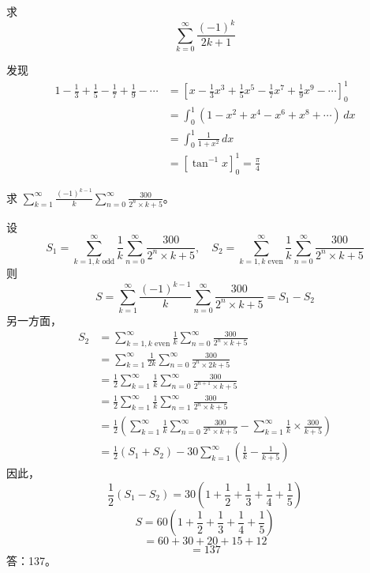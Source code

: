 \begin{questions}
    \question 求
    \[
    \sum_{k=0}^{\infty} \frac{(-1)^k}{2k+1}
    \]
    \begin{solution}
        发现
        \begin{align*}
        1-\frac{1}{3}+\frac{1}{5}-\frac{1}{7}+\frac{1}{9}- \cdots
        &= \left[x-\frac{1}{3}x^3 +\frac{1}{5}x^5 -\frac{1}{7}x^7+\frac{1}{9}x^9-\cdots\right] _0^1 \\
        &=\int_0^1 (1-x^2+x^4-x^6+x^8+\cdots)\,dx \\
        &=\int_0^1 \frac{1}{1+x^2}\,dx \\
        &= \left[ \tan^{-1} x \right]_0^1 = \frac{\pi}{4}
        \end{align*}
    \end{solution}

    \question 求 $\sum_{k=1}^{\infty} \frac{(-1)^{k-1}}{k} \sum_{n=0}^{\infty} \frac{300}{2^n \times k + 5}$。

\begin{solution}
设
\[
S_1 = \sum_{k=1, k \text{ odd}}^{\infty} \frac{1}{k} \sum_{n=0}^{\infty} \frac{300}{2^n \times k + 5}, \quad S_2 = \sum_{k=1, k \text{ even}}^{\infty} \frac{1}{k} \sum_{n=0}^{\infty} \frac{300}{2^n \times k + 5}
\]
则
\[
S = \sum_{k=1}^{\infty} \frac{(-1)^{k-1}}{k} \sum_{n=0}^{\infty} \frac{300}{2^n \times k + 5} = S_1 - S_2
\]
另一方面，
\begin{align*}
S_2 &= \sum_{k=1, k \text{ even}}^{\infty} \frac{1}{k} \sum_{n=0}^{\infty} \frac{300}{2^n \times k + 5} \\
&= \sum_{k=1}^{\infty} \frac{1}{2k} \sum_{n=0}^{\infty} \frac{300}{2^n \times 2k + 5} \\
&= \frac{1}{2} \sum_{k=1}^{\infty} \frac{1}{k} \sum_{n=0}^{\infty} \frac{300}{2^{n+1} \times k + 5} \\
&= \frac{1}{2} \sum_{k=1}^{\infty} \frac{1}{k} \sum_{n=1}^{\infty} \frac{300}{2^n \times k + 5} \\
&= \frac{1}{2} \left( \sum_{k=1}^{\infty} \frac{1}{k} \sum_{n=0}^{\infty} \frac{300}{2^n \times k + 5} - \sum_{k=1}^{\infty} \frac{1}{k} \times \frac{300}{k + 5} \right) \\
&= \frac{1}{2} (S_1 + S_2) - 30 \sum_{k=1}^{\infty} \left( \frac{1}{k} - \frac{1}{k+5} \right)
\end{align*}
因此，
\[
\frac{1}{2} (S_1 - S_2) = 30 \left( 1 + \frac{1}{2} + \frac{1}{3} + \frac{1}{4} + \frac{1}{5} \right)
\]
\[
S = 60 \left( 1 + \frac{1}{2} + \frac{1}{3} + \frac{1}{4} + \frac{1}{5} \right)
\]
\[
= 60 + 30 + 20 + 15 + 12
\]
\[
= 137
\]
答：137。
\end{solution}


\end{questions}
